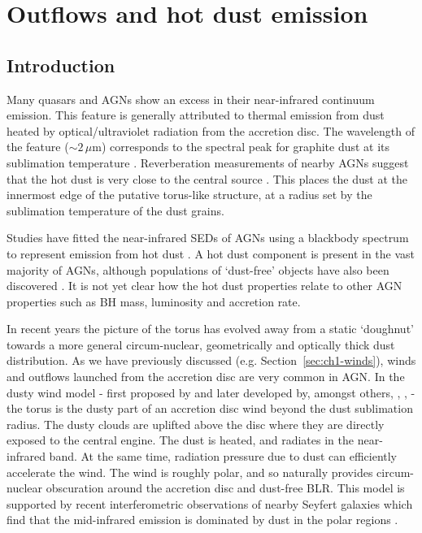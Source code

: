 
\chapter{Outflows and hot dust emission}
\label{ch:sed} 



\section{Introduction}

Many quasars and AGNs show an excess in their near-infrared continuum emission. 
This feature is generally attributed to thermal emission from dust heated by optical/ultraviolet radiation from the accretion disc. 
The wavelength of the feature ($\sim2$\,$\mu$m) corresponds to the spectral peak for graphite dust at its sublimation temperature \citep[${\mathrm T}\sim1500$\,K;][]{barvainis87}. 
Reverberation measurements of nearby AGNs suggest that the hot dust is very close to the central source \citep[few tens of light days; e.g.][]{minezaki04,suganuma06}.
This places the dust at the innermost edge of the putative torus-like structure, at a radius set by the sublimation temperature of the dust grains.  

Studies have fitted the near-infrared SEDs of AGNs using a blackbody spectrum to represent emission from hot dust \citep[e.g.][]{edelson86,barvainis87,kishimoto07,mor09,riffel09,deo11,landt11,mor11,roseboom13}. 
A hot dust component is present in the vast majority of AGNs, although populations of `dust-free' objects have also been discovered \citep{hao10,hao11,jiang10,mor11}. 
It is not yet clear how the hot dust properties relate to other AGN properties such as BH mass, luminosity and accretion rate. 

In recent years the picture of the torus has evolved away from a static `doughnut' towards a more general circum-nuclear, geometrically and optically thick dust distribution. 
As we have previously discussed (e.g. Section~\ref{sec:ch1-winds}), winds and outflows launched from the accretion disc are very common in AGN. 
In the dusty wind model - first proposed by \citet{konigl94} and later developed by, amongst others, \citet{everett05}, \citet{elitzur06}, \citet{keating12} - the torus is the dusty part of an accretion disc wind beyond the dust sublimation radius.  
The dusty clouds are uplifted above the disc where they are directly exposed to the central engine. 
The dust is heated, and radiates in the near-infrared band.
At the same time, radiation pressure due to dust can efficiently accelerate the wind. 
The wind is roughly polar, and so naturally provides circum-nuclear obscuration around the accretion disc and dust-free BLR.   
This model is supported by recent interferometric observations of nearby Seyfert galaxies which find that the mid-infrared emission is dominated by dust in the polar regions \citep[e.g.][]{honig12,honig13}.  

